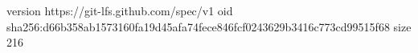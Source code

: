 version https://git-lfs.github.com/spec/v1
oid sha256:d66b358ab1573160fa19d45afa74fece846fcf0243629b3416c773cd99515f68
size 216
